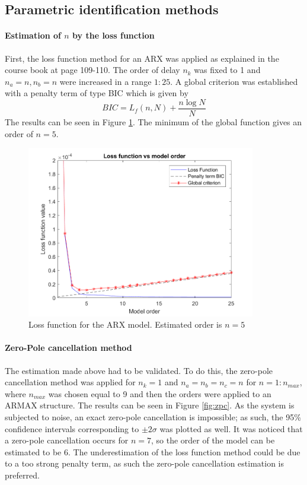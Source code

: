 \documentclass[a4paper,11pt]{article}
\begin{document}
\subsection{Parametric identification methods}
\paragraph{Estimation of $n$ by the loss function}  First, the loss function method for an ARX was applied as explained in the course book at page 109-110. The order of delay $n_k$ was fixed to 1 and $n_a = n, n_b = n$ were increased in a range $1 : 25$. A global criterion was established with a penalty term of type BIC which is given by
\begin{equation}
BIC = L_f(n,N) + \frac{n\log{N}}{N}
\label{eq:bic}
\end{equation}
The results can be seen in Figure \ref{fig:loss_funct_1}. The minimum of the global function gives an order of $n = 5$.

\begin{figure}[H]
\centering
\includegraphics[width = 10cm]{images/1_loss_funct_order}
\caption{Loss function for the ARX model. Estimated order is $n = 5$}
\label{fig:loss_funct_1}
\end{figure}

\paragraph{Zero-Pole cancellation method}
The estimation made above had to be validated. To do this, the zero-pole cancellation method was applied for $n_k = 1$ and $n_a = n_b = n_c = n$ for $n = 1:n_{max}$, where $n_{max}$ was chosen equal to 9 and then the orders were applied to an ARMAX structure. The results can be seen in Figure \ref{fig:zpc}.
As the system is subjected to noise, an exact zero-pole cancellation is impossible; as such, the 95\% confidence intervals corresponding to $\pm2\sigma$ was plotted as well. It was noticed that a zero-pole cancellation occurs for $n = 7$, so the order of the model can be estimated to be 6. The underestimation of the loss function method could be due to a too strong penalty term, as such the zero-pole cancellation estimation is preferred.
\end{document}
